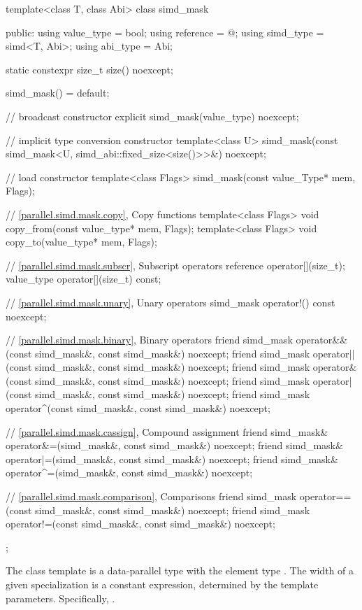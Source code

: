 \begin{codeblock}
template<class T, class Abi> class simd_mask {
public:
  using value_type = bool;
  using reference = @\seebelow@;
  using simd_type = simd<T, Abi>;
  using abi_type = Abi;

  static constexpr size_t size() noexcept;

  simd_mask() = default;

  // broadcast constructor
  explicit simd_mask(value_type) noexcept;

  // implicit type conversion constructor
  template<class U>
    simd_mask(const simd_mask<U, simd_abi::fixed_size<size()>>&) noexcept;

  // load constructor
  template<class Flags> simd_mask(const value_Type* mem, Flags);

  // \ref{parallel.simd.mask.copy}, Copy functions
  template<class Flags> void copy_from(const value_type* mem, Flags);
  template<class Flags> void copy_to(value_type* mem, Flags);

  // \ref{parallel.simd.mask.subscr}, Subscript operators
  reference operator[](size_t);
  value_type operator[](size_t) const;

  // \ref{parallel.simd.mask.unary}, Unary operators
  simd_mask operator!() const noexcept;

  // \ref{parallel.simd.mask.binary}, Binary operators
  friend simd_mask operator&&(const simd_mask&, const simd_mask&) noexcept;
  friend simd_mask operator||(const simd_mask&, const simd_mask&) noexcept;
  friend simd_mask operator&(const simd_mask&, const simd_mask&) noexcept;
  friend simd_mask operator|(const simd_mask&, const simd_mask&) noexcept;
  friend simd_mask operator^(const simd_mask&, const simd_mask&) noexcept;

  // \ref{parallel.simd.mask.cassign}, Compound assignment
  friend simd_mask& operator&=(simd_mask&, const simd_mask&) noexcept;
  friend simd_mask& operator|=(simd_mask&, const simd_mask&) noexcept;
  friend simd_mask& operator^=(simd_mask&, const simd_mask&) noexcept;

  // \ref{parallel.simd.mask.comparison}, Comparisons
  friend simd_mask operator==(const simd_mask&, const simd_mask&) noexcept;
  friend simd_mask operator!=(const simd_mask&, const simd_mask&) noexcept;
};
\end{codeblock}

\pnum
The class template  is a data-parallel type with the element type . The width of a given  specialization is a constant expression, determined by the template parameters. Specifically, .

